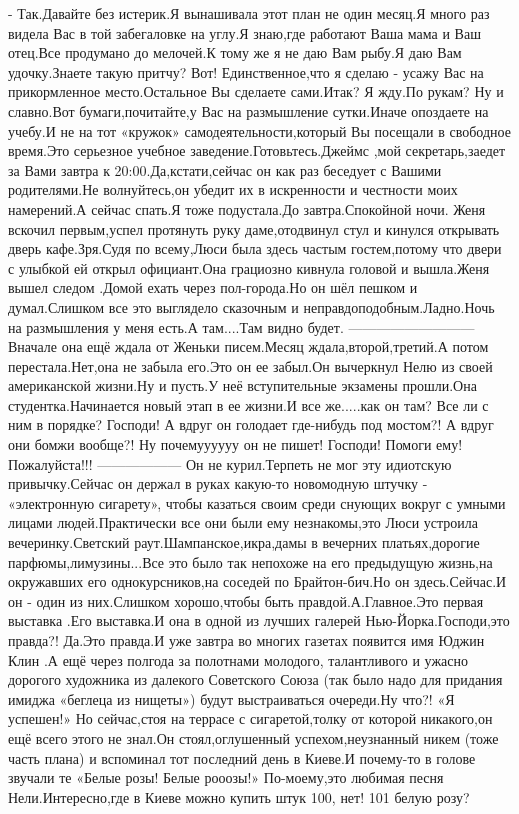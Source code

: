 - Так.Давайте без истерик.Я вынашивала этот план не один месяц.Я много раз видела Вас в той забегаловке на углу.Я знаю,где работают Ваша мама и Ваш отец.Все продумано до мелочей.К тому же я не даю Вам рыбу.Я даю Вам удочку.Знаете такую притчу? Вот! Единственное,что я сделаю - усажу Вас на прикормленное место.Остальное Вы сделаете сами.Итак? Я жду.По рукам? Ну и славно.Вот бумаги,почитайте,у Вас на размышление сутки.Иначе опоздаете на учебу.И не на тот «кружок» самодеятельности,который Вы посещали в свободное время.Это серьезное учебное заведение.Готовьтесь.Джеймс ,мой секретарь,заедет за Вами завтра к 20:00.Да,кстати,сейчас он как раз беседует с Вашими родителями.Не волнуйтесь,он убедит их в искренности и честности моих намерений.А сейчас спать.Я тоже подустала.До завтра.Спокойной ночи.
Женя вскочил первым,успел протянуть руку даме,отодвинул стул и кинулся открывать дверь кафе.Зря.Судя по всему,Люси была здесь частым гостем,потому что двери с улыбкой ей открыл официант.Она грациозно кивнула головой и вышла.Женя вышел следом .Домой ехать через пол-города.Но он шёл пешком и думал.Слишком все это выглядело сказочным и неправдоподобным.Ладно.Ночь на размышления у меня есть.А там....Там видно будет.
—————————
Вначале она ещё ждала от Женьки писем.Месяц ждала,второй,третий.А потом перестала.Нет,она не забыла его.Это он ее забыл.Он вычеркнул Нелю из своей американской жизни.Ну и пусть.У неё вступительные экзамены прошли.Она студентка.Начинается новый этап в ее жизни.И все же.....как он там? Все ли с ним в порядке? Господи! А вдруг он голодает где-нибудь под мостом?! А вдруг они бомжи вообще?! Ну почемуууууу он не пишет! Господи! Помоги ему! Пожалуйста!!! 
——————
Он не курил.Терпеть не мог эту идиотскую привычку.Сейчас он держал в руках какую-то новомодную штучку - «электронную сигарету», чтобы казаться своим среди снующих вокруг с умными лицами людей.Практически все они были ему незнакомы,это Люси устроила вечеринку.Светский раут.Шампанское,икра,дамы в вечерних платьях,дорогие парфюмы,лимузины...Все это было так непохоже на его предыдущую жизнь,на окружавших его однокурсников,на соседей по Брайтон-бич.Но он здесь.Сейчас.И он - один из них.Слишком хорошо,чтобы быть правдой.А.Главное.Это первая выставка .Его выставка.И она в одной из лучших галерей Нью-Йорка.Господи,это правда?! Да.Это правда.И уже завтра во многих газетах появится имя Юджин Клин .А ещё через полгода за полотнами молодого, талантливого и ужасно дорогого художника из далекого Советского Союза (так было надо для придания имиджа «беглеца из нищеты») будут выстраиваться очереди.Ну что?! «Я успешен!» Но сейчас,стоя на террасе с сигаретой,толку от которой никакого,он ещё всего этого не знал.Он стоял,оглушенный успехом,неузнанный никем (тоже часть плана) и вспоминал тот последний день в Киеве.И почему-то в голове звучали те «Белые розы! Белые рооозы!» По-моему,это любимая песня Нели.Интересно,где в Киеве можно купить штук 100, нет! 101 белую розу?
